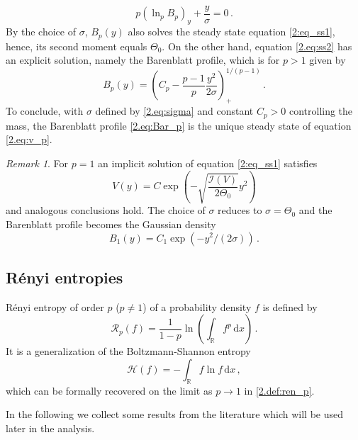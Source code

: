 \documentclass[12pt]{amsart}
\newcommand{\R}{{\mathbb R}}
\newcommand{\renyi}{{\mathcal{R}}}
\newcommand{\dd}{{\mathrm{d}}}
\newcommand{\M}{\Theta}
\newcommand{\I}{\mathcal{I}}
\newcommand{\entropy}{\mathcal{H}}
\theoremstyle{plain}
\theoremstyle{definition}
\theoremstyle{remark}
\newtheorem{remark}{Remark}[section]
\begin{document}
\begin{equation}\label{2.eq:ss2}
    p\left(\ln_p B_p\right)_y + \frac{y}{\sigma} = 0\,.
\end{equation}
By the choice of $\sigma$, $B_p(y)$ also solves the steady state equation \eqref{2:eq_ss1}, hence, its second moment equals $\M_0$. On the other hand, equation \eqref{2.eq:ss2} has an explicit solution, namely the Barenblatt profile, which is for $p>1$ given by
\begin{equation}\label{2.eq:Bar_p}
    B_p(y) = \left(C_p - \frac{p-1}{p}\frac{y^2}{2\sigma}\right)_+^{1/(p-1)}\,.
\end{equation}
To conclude, with $\sigma$ defined by \eqref{2.eq:sigma} and constant $C_p>0$ controlling the mass, the Barenblatt profile \eqref{2.eq:Bar_p} is the unique steady state of equation \eqref{2.eq:v_p}.
\begin{remark}
    For $p=1$ an implicit solution of equation \eqref{2:eq_ss1} satisfies 
    \begin{equation*}
        V(y) = C\exp\left({-\sqrt{\frac{\I(V)}{2\M_0}}y^2}\right)
    \end{equation*}
    and analogous conclusions hold. The choice of $\sigma$ reduces to $\sigma = \M_0$ and the Barenblatt profile becomes the Gaussian density
    \begin{equation*}
        B_1(y) = C_1\exp(-y^2/(2\sigma))\,.
    \end{equation*}
\end{remark}

\subsection{R\'enyi entropies}
R\'enyi entropy of order $p$ ($p\neq 1$) of a probability density $f$ is defined by \cite{CoTh91,Ren60}
\begin{equation}\label{2.def:ren_p}
    \renyi_p(f) = \frac{1}{1-p}\ln\left(\int_\R f^p\, \dd x\right)\,.
\end{equation}
It is a generalization of the Boltzmann-Shannon entropy \cite{CoTh91, Sha48}
\begin{equation*}
    \entropy(f) = -\int_\R f\ln f\, \dd x\,,
\end{equation*}
which can be formally recovered on the limit as $p\to 1$ in \eqref{2.def:ren_p}.

In the following we collect some results from the literature which will be used later in the analysis. 
\end{document}

